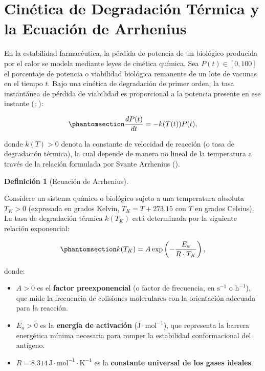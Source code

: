 \documentclass[
  spanish,
  us-letterpaper,
]{scrreprt}
\providecommand{\tightlist}{%
  \setlength{\itemsep}{0pt}\setlength{\parskip}{0pt}}
\numberwithin{equation}{section}
\theoremstyle{plain}
\theoremstyle{plain}
\theoremstyle{plain}
\theoremstyle{definition}
\newtheorem{definition}{Definición}[chapter]
\theoremstyle{remark}
\begin{document}
\section{Cinética de Degradación Térmica y la Ecuación de
Arrhenius}\label{sec-fundamento-arrhenius}

En la estabilidad farmacéutica, la pérdida de potencia de un biológico
producida por el calor se modela mediante leyes de cinética química. Sea
\(P(t) \in [0, 100]\) el porcentaje de potencia o viabilidad biológica
remanente de un lote de vacunas en el tiempo \(t\). Bajo una cinética de
degradación de primer orden, la tasa instantánea de pérdida de
viabilidad es proporcional a la potencia presente en ese instante
(;
):

\begin{equation}\phantomsection\label{eq-cinetica-primer-orden}{
\frac{dP(t)}{dt} = -k(T(t)) P(t),
}\end{equation}

donde \(k(T) > 0\) denota la constante de velocidad de reacción (o tasa
de degradación térmica), la cual depende de manera no lineal de la
temperatura a través de la relación formulada por Svante Arrhenius
().

\begin{definition}[Ecuación de
Arrhenius]\protect\hypertarget{def-ecuacion-arrhenius}{}\label{def-ecuacion-arrhenius}

Considere un sistema químico o biológico sujeto a una temperatura
absoluta \(T_K > 0\) (expresada en grados Kelvin, \(T_K = T + 273.15\)
con \(T\) en grados Celsius). La tasa de degradación térmica \(k(T_K)\)
está determinada por la siguiente relación exponencial:

\begin{equation}\phantomsection\label{eq-arrhenius-teorica}{
k(T_K) = A \exp\left( -\frac{E_a}{R \cdot T_K} \right),
}\end{equation}

donde:

\begin{itemize}
\tightlist
\item
  \(A > 0\) es el \textbf{factor preexponencial} (o factor de
  frecuencia, en \(\text{s}^{-1}\) o \(\text{h}^{-1}\)), que mide la
  frecuencia de colisiones moleculares con la orientación adecuada para
  la reacción.
\item
  \(E_a > 0\) es la \textbf{energía de activación}
  (\(\text{J}\cdot\text{mol}^{-1}\)), que representa la barrera
  energética mínima necesaria para romper la estabilidad conformacional
  del antígeno.
\item
  \(R = 8.314\,\text{J}\cdot\text{mol}^{-1}\cdot\text{K}^{-1}\) es la
  \textbf{constante universal de los gases ideales}.
\end{itemize}

\end{definition}
\end{document}
